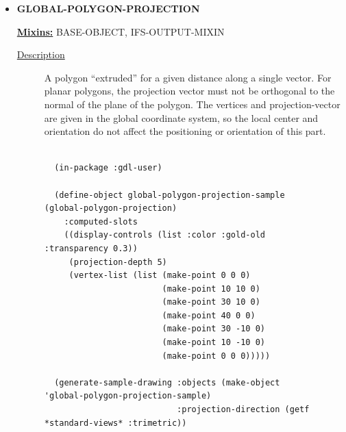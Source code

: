 \documentclass [11pt]{book}
\begin{document}
\begin{itemize}
\begin{description}
\end{description}







\item {}
\textbf{GLOBAL-POLYGON-PROJECTION}


\textbf{
\underline{Mixins:}} BASE-OBJECT, IFS-OUTPUT-MIXIN





\begin{description}

\item [
\underline{Description}]


A polygon ``extruded'' for a given distance along a single vector.
For planar polygons, the projection vector must not be orthogonal to the normal of the plane of
the polygon. The vertices and projection-vector are given in the global coordinate system, so
the local center and orientation do not affect the positioning or orientation of this part.



\end{description}




\begin{figure}
\begin{lrbox}{\boxedverb}
\begin{minipage}{\linewidth}
{\small

\begin{verbatim}

  (in-package :gdl-user)

  (define-object global-polygon-projection-sample (global-polygon-projection)
    :computed-slots
    ((display-controls (list :color :gold-old :transparency 0.3))
     (projection-depth 5)
     (vertex-list (list (make-point 0 0 0)
                        (make-point 10 10 0)
                        (make-point 30 10 0)
                        (make-point 40 0 0)
                        (make-point 30 -10 0)
                        (make-point 10 -10 0)
                        (make-point 0 0 0)))))

  (generate-sample-drawing :objects (make-object 'global-polygon-projection-sample)
                           :projection-direction (getf *standard-views* :trimetric))  

  
\end{verbatim}}
\end{minipage}
\end{lrbox}
\fbox{\usebox{\boxedverb}}


\end{figure}
\end{itemize}
\end{document}
